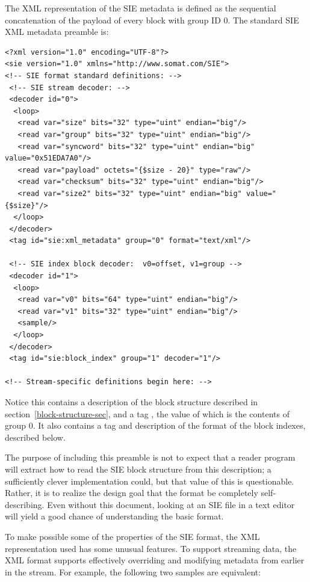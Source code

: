 \documentclass{article}
\begin{document}
The XML representation of the SIE metadata is defined as the
sequential concatenation of the payload of every block with group ID
0.  The standard SIE XML metadata preamble is:

\begin{lstlisting}[language=siexml,frame=simple]
<?xml version="1.0" encoding="UTF-8"?>
<sie version="1.0" xmlns="http://www.somat.com/SIE">
<!-- SIE format standard definitions: -->
 <!-- SIE stream decoder: -->
 <decoder id="0">
  <loop>
   <read var="size" bits="32" type="uint" endian="big"/>
   <read var="group" bits="32" type="uint" endian="big"/>
   <read var="syncword" bits="32" type="uint" endian="big" value="0x51EDA7A0"/>
   <read var="payload" octets="{$size - 20}" type="raw"/>
   <read var="checksum" bits="32" type="uint" endian="big"/>
   <read var="size2" bits="32" type="uint" endian="big" value="{$size}"/>
  </loop>
 </decoder>
 <tag id="sie:xml_metadata" group="0" format="text/xml"/>

 <!-- SIE index block decoder:  v0=offset, v1=group -->
 <decoder id="1">
  <loop>
   <read var="v0" bits="64" type="uint" endian="big"/>
   <read var="v1" bits="32" type="uint" endian="big"/>
   <sample/>
  </loop>
 </decoder>
 <tag id="sie:block_index" group="1" decoder="1"/>

<!-- Stream-specific definitions begin here: -->
\end{lstlisting}

Notice this contains a description of the block structure described in
section~\ref{block-structure-sec}, and a tag ,
the value of which is the contents of group 0.  It also contains a tag
and description of the format of the block indexes, described below.

The purpose of including this preamble is not to expect that a reader
program will extract how to read the SIE block structure from this
description; a sufficiently clever implementation could, but that
value of this is questionable.  Rather, it is to realize the design
goal that the format be completely self-describing.  Even without this
document, looking at an SIE file in a text editor will yield a good
chance of understanding the basic format.

To make possible some of the properties of the SIE format, the XML
representation used has some unusual features.  To support streaming
data, the XML format supports effectively overriding and modifying
metadata from earlier in the stream.  For example, the following two
samples are equivalent:
\end{document}
